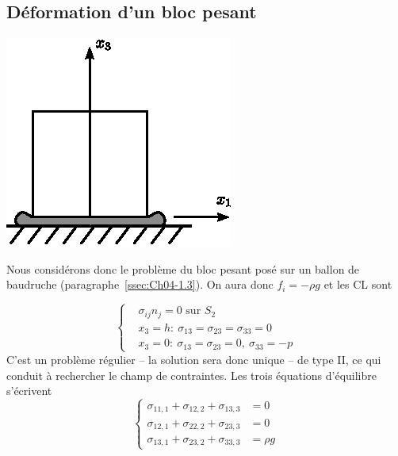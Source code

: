 \subsection{Déformation d'un bloc pesant} \label{ssec:Ch06-2.1}
\begin{multicols}{2}
    \begin{center}
        \includegraphics{../images/T1_Ch06-01}
    \end{center}
    \columnbreak
    Nous considérons donc le problème du bloc pesant posé sur un ballon de baudruche (paragraphe~\ref{ssec:Ch04-1.3}).
    On aura donc $f_i = -\rho g$ et les CL sont
\end{multicols}
\begin{equation}
    \left\{
    \begin{aligned}
        & \sigma_{ij} n_j = 0 \text{ sur } S_2 \\
        & x_3 = h:\ \sigma_{13} = \sigma_{23} = \sigma_{33} = 0 \\
        & x_3 = 0:\ \sigma_{13} = \sigma_{23} = 0, \ \sigma_{33} = -p
    \end{aligned}
    \right.
    \label{eq:Ch06-032}
\end{equation}
C'est un problème régulier -- la solution sera donc unique -- de type II, ce qui conduit à rechercher le champ de contraintes.
Les trois équations d'équilibre s'écrivent
\begin{equation}
    \left\{
    \begin{aligned}
        \sigma_{11,1} + \sigma_{12,2} + \sigma_{13,3} &= 0 \\
        \sigma_{12,1} + \sigma_{22,2} + \sigma_{23,3} &= 0 \\
        \sigma_{13,1} + \sigma_{23,2} + \sigma_{33,3} &= \rho g
    \end{aligned}
    \right.
    \label{eq:Ch06-033}
\end{equation}

